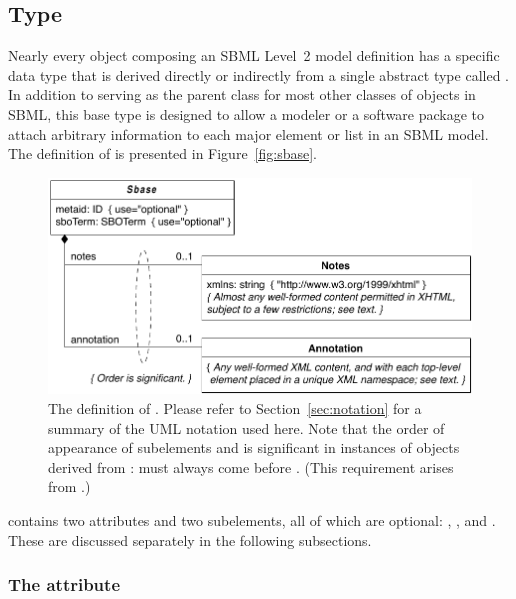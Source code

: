 \subsection{Type }
\label{sec:sbase}

Nearly every object composing an SBML Level~2 model definition has a
specific data type that is derived directly or indirectly from a
single abstract type called \SBase.  In addition to
serving as the parent class for most other classes of objects in
SBML, this base type is designed to allow a modeler
or a software package to attach arbitrary information to each major
element or list in an SBML model.  The definition of \SBase is
presented in Figure~\vref{fig:sbase}.

\begin{figure}[hbt]
  \centering
  \small
  \vspace*{-1ex}
  \includegraphics[scale=0.8]{figs/sbase-uml}
  \caption{The definition of \SBase.  Please refer to
    Section~\protect\ref{sec:notation} for a summary of the UML
    notation used here.  Note that the order of appearance of
    subelements  and  is
    significant in instances of objects derived from
    :  must always come before
    .  (This requirement arises from
    \xmlschemaone.)}
  \label{fig:sbase}
\end{figure}

\SBase contains two attributes and two subelements, all of which are optional:
, ,  and
.  These are discussed separately in the
following subsections.


\subsubsection{The  attribute}
\label{sec:metaid}

